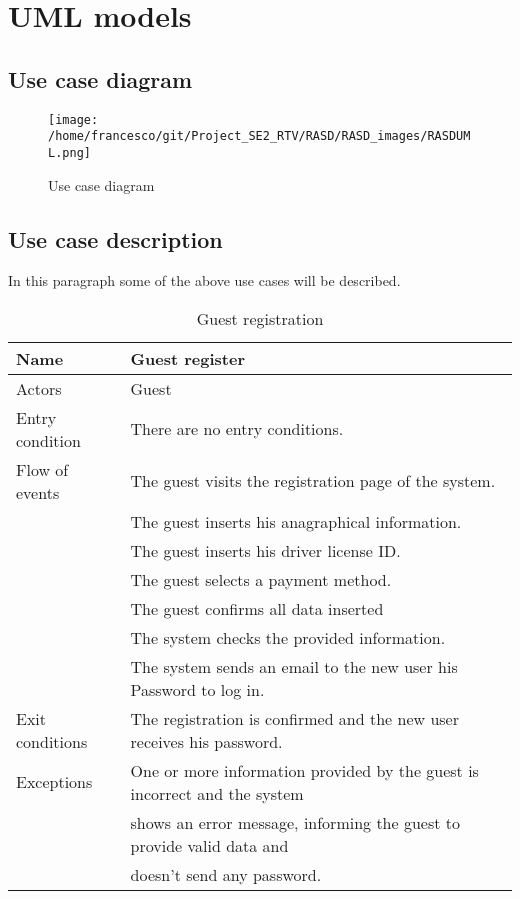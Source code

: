\documentclass[10pt, a4paper,titlepage]{article}
\begin{document}
\section{UML models}
\subsection{Use case diagram}
\begin{figure}[!h]
\texttt{[image: /home/francesco/git/Project\_SE2\_RTV/RASD/RASD\_images/RASDUML.png]}
\caption{Use case diagram}
\label{fig:use case}
\end{figure}
\newpage
\subsection{Use case description}
In this paragraph some of the above use cases will be described.
\begin{table}[h]
\caption{Guest registration} \label{tab:scenario1}
\begin{tabular}{|l|l|}
\hline
Name & Guest register \\
\hline
Actors & Guest \\
\hline
Entry condition & There are no entry conditions. \\
\hline
Flow of events & The guest visits the registration page of the system. \\
& The guest inserts his anagraphical information.\\
& The guest inserts his driver license ID.\\
& The guest selects a payment method.\\
& The guest confirms all data inserted\\
& The system checks the provided information.\\
& The system sends an email to the new user his Password to log in.\\
\hline
Exit conditions & The registration is confirmed and the new user receives his password. \\
\hline
Exceptions & One or more information provided by the guest is incorrect and the system \\
& shows an error message, informing the guest to provide valid data and \\
& doesn't send any password.\\
\hline
\end{tabular}
\end{table}
\end{document}
